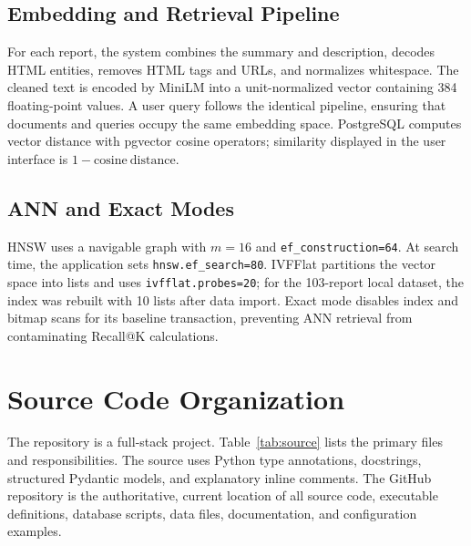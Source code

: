 \documentclass[conference]{IEEEtran}
\begin{document}
\subsection{Embedding and Retrieval Pipeline}
For each report, the system combines the summary and description, decodes HTML entities, removes HTML tags and URLs, and normalizes whitespace. The cleaned text is encoded by MiniLM into a unit-normalized vector containing 384 floating-point values. A user query follows the identical pipeline, ensuring that documents and queries occupy the same embedding space. PostgreSQL computes vector distance with pgvector cosine operators; similarity displayed in the user interface is $1 - \mathrm{cosine\ distance}$.

\subsection{ANN and Exact Modes}
HNSW uses a navigable graph with $m=16$ and \texttt{ef\_construction=64}. At search time, the application sets \texttt{hnsw.ef\_search=80}. IVFFlat partitions the vector space into lists and uses \texttt{ivfflat.probes=20}; for the 103-report local dataset, the index was rebuilt with 10 lists after data import. Exact mode disables index and bitmap scans for its baseline transaction, preventing ANN retrieval from contaminating Recall@K calculations.

\section{Source Code Organization}
The repository is a full-stack project. Table~\ref{tab:source} lists the primary files and responsibilities. The source uses Python type annotations, docstrings, structured Pydantic models, and explanatory inline comments. The GitHub repository is the authoritative, current location of all source code, executable definitions, database scripts, data files, documentation, and configuration examples.
\end{document}

